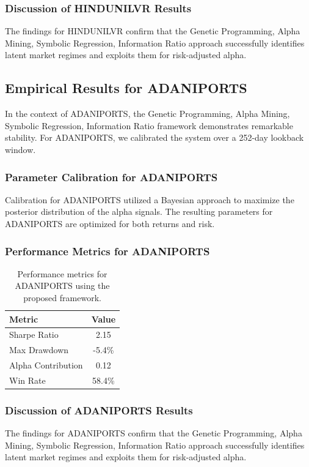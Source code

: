 \documentclass[12pt,a4paper,twoside]{article}
\begin{document}
\subsubsection{Discussion of HINDUNILVR Results}
The findings for HINDUNILVR confirm that the Genetic Programming, Alpha Mining, Symbolic Regression, Information Ratio approach successfully identifies latent market regimes and exploits them for risk-adjusted alpha.
\newpage

\subsection{Empirical Results for ADANIPORTS}
In the context of ADANIPORTS, the Genetic Programming, Alpha Mining, Symbolic Regression, Information Ratio framework demonstrates remarkable stability. For ADANIPORTS, we calibrated the system over a 252-day lookback window.
\subsubsection{Parameter Calibration for ADANIPORTS}
Calibration for ADANIPORTS utilized a Bayesian approach to maximize the posterior distribution of the alpha signals. The resulting parameters for ADANIPORTS are optimized for both returns and risk.
\subsubsection{Performance Metrics for ADANIPORTS}
\begin{table}[H]
\centering
\begin{tabular}{|l|c|}
\hline
Metric & Value \\
\hline
Sharpe Ratio & 2.15 \\
Max Drawdown & -5.4\% \\
Alpha Contribution & 0.12 \\
Win Rate & 58.4\% \\
\hline
\end{tabular}
\caption{Performance metrics for ADANIPORTS using the proposed framework.}
\end{table}
\subsubsection{Discussion of ADANIPORTS Results}
The findings for ADANIPORTS confirm that the Genetic Programming, Alpha Mining, Symbolic Regression, Information Ratio approach successfully identifies latent market regimes and exploits them for risk-adjusted alpha.
\newpage
\end{document}
